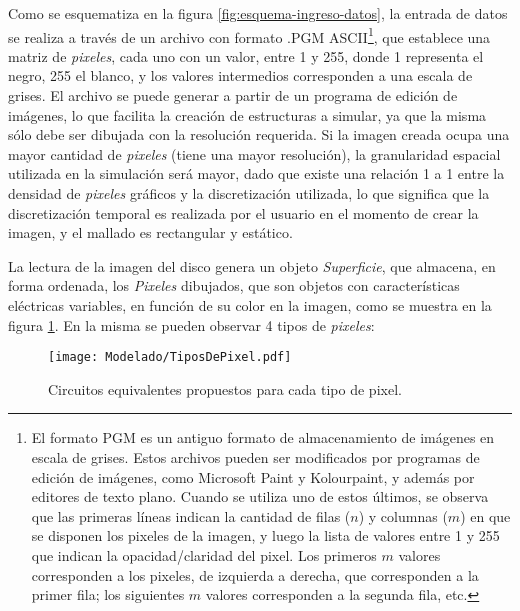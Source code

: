 Como se esquematiza en la figura \ref{fig:esquema-ingreso-datos}, la entrada de datos se realiza a través de un archivo con formato \textsc{.PGM} ASCII\footnote{El formato PGM es un antiguo formato de almacenamiento de imágenes en escala de grises. Estos archivos pueden ser modificados por programas de edición de imágenes, como Microsoft Paint y Kolourpaint, y además por editores de texto plano. Cuando se utiliza uno de estos últimos, se observa que las primeras líneas indican la cantidad de filas ($n$) y columnas ($m$) en que se disponen los pixeles de la imagen, y luego la lista de valores entre 1 y 255 que indican la opacidad/claridad del pixel. Los primeros $m$ valores corresponden a los pixeles, de izquierda a derecha, que corresponden a la primer fila; los siguientes $m$ valores corresponden a la segunda fila, etc.}, que establece una matriz de \textit{pixeles}, cada uno con un valor, entre 1 y 255, donde 1 representa el negro, 255 el blanco, y los valores intermedios corresponden a una escala de grises. El archivo se puede generar a partir de un programa de edición de imágenes, lo que facilita la creación de estructuras a simular, ya que la misma sólo debe ser dibujada con la resolución requerida. Si la imagen creada ocupa una mayor cantidad de \textit{pixeles} (tiene una mayor resolución), la granularidad espacial utilizada en la simulación será mayor, dado que existe una relación 1 a 1 entre la densidad de \textit{pixeles} gráficos y la discretización utilizada, lo que significa que la discretización temporal es realizada por el usuario en el momento de crear la imagen, y el mallado es rectangular y estático.

La lectura de la imagen del disco genera un objeto \textit{Superficie}, que almacena, en forma ordenada, los \textit{Pixeles} dibujados, que son objetos con características eléctricas variables, en función de su color en la imagen, como se muestra en la figura \ref{fig:tiposdepixeles}. En la misma se pueden observar 4 tipos de \textit{pixeles}:

\begin{figure}[h]
	\centering
	\texttt{[image: Modelado/TiposDePixel.pdf]}
	\caption{Circuitos equivalentes propuestos para cada tipo de pixel.}
	\label{fig:tiposdepixeles}
\end{figure}

